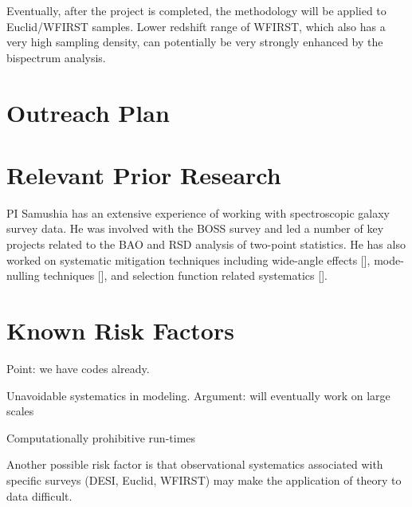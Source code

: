 Eventually, after the project is completed, the methodology will be applied to
Euclid/WFIRST samples. Lower redshift range of WFIRST, which also has a very
high sampling density, can potentially be very strongly enhanced by the
bispectrum analysis.

\section{Outreach Plan}






\section{Relevant Prior Research}

PI Samushia has an extensive experience of working with spectroscopic galaxy
survey data. He was involved with the BOSS survey and led a number of key
projects related to the BAO and RSD analysis of two-point statistics. He has
also worked on systematic mitigation techniques including wide-angle effects
[], mode-nulling techniques [], and selection function related systematics [].





\section{Known Risk Factors}


Point: we have codes already.

Unavoidable systematics in modeling. Argument: will eventually work on large
scales

Computationally prohibitive run-times

Another possible risk factor is that observational
systematics associated with specific surveys (DESI, Euclid, WFIRST) may make
the application of theory to data difficult. 


